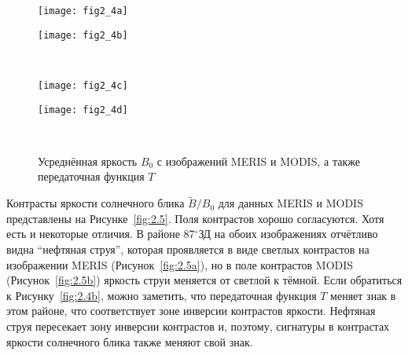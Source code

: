 \begin{figure}[H]
   	\centering
	\begin{minipage}{.47\textwidth}
	    \subcaptionbox{\label{fig:2.4a}}
		{\texttt{[image: fig2\_4a]}}
	\end{minipage}
	\hfill
	\begin{minipage}{.47\textwidth}
	    \subcaptionbox{\label{fig:2.4b}}
		{\texttt{[image: fig2\_4b]}}
	\end{minipage}
	\\
	\begin{minipage}{.47\textwidth}
	    \subcaptionbox{\label{fig:2.4c}}
		{\texttt{[image: fig2\_4c]}}
	\end{minipage}
	\hfill
	\begin{minipage}{.47\textwidth}
	    \subcaptionbox{\label{fig:2.4d}}
		{\texttt{[image: fig2\_4d]}}
	\end{minipage}
    \\
    \caption{Усреднённая яркость $B_{0} $ с изображений MERIS и MODIS, а также передаточная функция $T$}
    \label{fig:2.4}
\end{figure}


Контрасты яркости солнечного блика $\tilde{B}/B_{0}$ для данных MERIS и MODIS представлены на Рисунке~\ref{fig:2.5}. Поля контрастов хорошо согласуются. Хотя есть и некоторые отличия. В районе 87${}^\circ$ЗД на обоих изображениях отчётливо видна ``нефтяная струя'', которая проявляется в виде светлых контрастов на изображении MERIS (Рисунок~\ref{fig:2.5a}), но в поле контрастов MODIS (Рисунок~\ref{fig:2.5b}) яркость струи меняется от светлой к тёмной. Если обратиться к Рисунку~\ref{fig:2.4b}, можно заметить, что передаточная функция $T$ меняет знак в этом районе, что соответствует зоне инверсии контрастов яркости. Нефтяная струя пересекает зону инверсии контрастов и, поэтому, сигнатуры в контрастах яркости солнечного блика также меняют свой знак.



